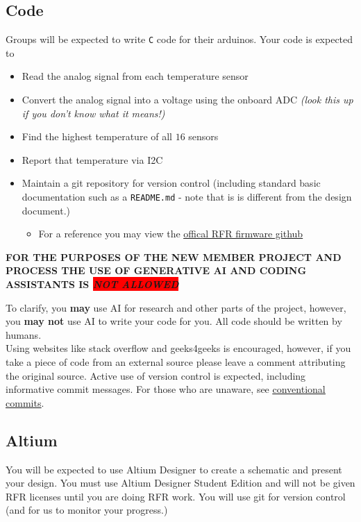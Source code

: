 \documentclass{article}
\begin{document}
    \subsection*{Code}
    Groups will be expected to write \texttt{C} code for their arduinos. Your code is expected to 
    \begin{itemize}
        \item Read the analog signal from each temperature sensor
        \item Convert the analog signal into a voltage using the onboard ADC {\tiny{\textit{(look this up if you don't know what it means!)}}} 
        \item Find the highest temperature of all $16$ sensors 
        \item Report that temperature via I2C
        \item Maintain a git repository for version control (including standard basic documentation such as a \texttt{README.md} - note that is is different from the design document.)
        \begin{itemize}
            \item For a reference you may view the \href{https://github.com/rutgers-fsae/firmware}{\underline{offical RFR firmware github}}
        \end{itemize}
    \end{itemize}
    \begin{tcolorbox} 
    {\Large \textbf{FOR THE PURPOSES OF THE NEW MEMBER PROJECT AND PROCESS THE USE OF GENERATIVE AI AND CODING ASSISTANTS IS \colorbox{red}{\textit{NOT ALLOWED}}}}
    \end{tcolorbox}
    To clarify, you \textbf{may} use AI for research and other parts of the project, however, you \textbf{may not} use AI to write your code for you. All code should be written by humans. \\
    Using websites like stack overflow and geeks4geeks is encouraged, however, if you take a piece of code from an external source please leave a comment attributing the original source.
    Active use of version control is expected, including informative commit messages. For those who are unaware, see \href{https://www.conventionalcommits.org/en/v1.0.0/}{\underline{conventional commits}}.

\subsection*{Altium}
    You will be expected to use Altium Designer to create a schematic and present your design. 
    You must use Altium Designer Student Edition and will not be given RFR licenses until you are doing RFR work. You will use git for version control (and for us to monitor your progress.)
\end{document}
